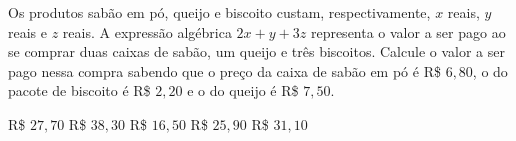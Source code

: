 Os produtos sabão em pó, queijo e biscoito custam, respectivamente, $x$ reais, $y$ reais e $z$ reais. A expressão algébrica $2x+y+3z$ representa o valor a ser pago ao se comprar duas caixas de sabão, um queijo e três biscoitos. Calcule o valor a ser pago nessa compra sabendo que o preço da caixa de sabão em pó é R\$ $6{,}80$, o do pacote de biscoito é R\$ $2{,}20$ e o do queijo é R\$ $7{,}50$.

R\$ $27{,}70$
R\$ $38{,}30$
R\$ $16{,}50$
R\$ $25{,}90$
R\$ $31{,}10$



